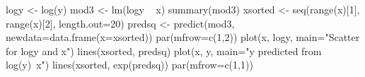 \begin{Schunk}
\begin{Sinput}
 logy <- log(y)
 mod3 <- lm(logy ~ x)
 summary(mod3)
 xsorted <- seq(range(x)[1], range(x)[2], length.out=20)
 predsq <- predict(mod3, newdata=data.frame(x=xsorted))
 par(mfrow=c(1,2))
 plot(x, logy, main="Scatter for logy and x")
 lines(xsorted, predsq)
 plot(x, y, main="y predicted from log(y)~x")
 lines(xsorted, exp(predsq))
 par(mfrow=c(1,1))
\end{Sinput}
\end{Schunk}
